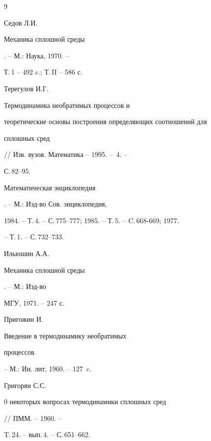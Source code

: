 \begin{thebibliography}{9}







Седов Л.И. {\em


Механика сплошной среды}. -- М.: Наука, 1970. --


Т.\,1 -- 492 c.; Т.\,II -- 586 с.







Терегулов И.Г. {\em


Термодинамика необратимых процессов и


теоретические основы построения определяющих соотношений для


сплошных сред} // Изв. вузов. Математика -- 1995. -- \No\,4. --


С.\,82--95.







{\em


Математическая энциклопедия}. -- М.: Изд-во Сов. энциклопедия,


1984. -- Т.\,4. -- С.\,775--777; 1985. -- Т.\,5. -- C.\,668-669; 1977.


-- Т.\,1. -- С.\,732--733.







Ильюшин А.А. {\em


Механика сплошной среды}. -- М.: Изд-во


МГУ, 1971. -- 247 с.







Пригожин И. {\em


Введение в термодинамику необратимых


процессов.} -- М.: Ин. лит, 1960. -- 127~c.







Григорян С.С. {\em


0 некоторых вопросах термодинамики сплошных сред} // ПММ. -- 1960. --


T.\,24. -- вып.\,4. -- С.\,651--662.






\end{thebibliography}
